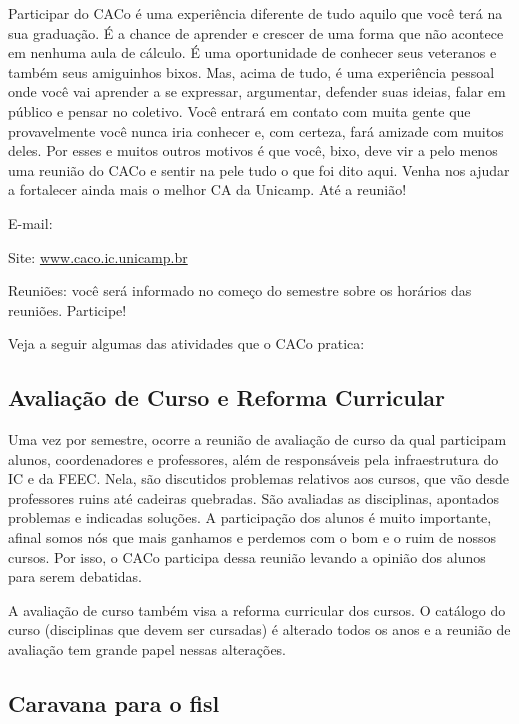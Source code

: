 Participar do CACo é uma experiência diferente de tudo aquilo que você terá na
sua graduação. É a chance de aprender e crescer de uma forma que não acontece em
nenhuma aula de cálculo. É uma oportunidade de conhecer seus veteranos e também
seus amiguinhos bixos. Mas, acima de tudo, é uma experiência pessoal onde você
vai aprender a se expressar, argumentar, defender suas ideias, falar em público
e pensar no coletivo. Você entrará em contato com muita gente que provavelmente
você nunca iria conhecer e, com certeza, fará amizade com muitos deles. Por
esses e muitos outros motivos é que você, bixo, deve vir a pelo menos uma
reunião do CACo e sentir na pele tudo o que foi dito aqui. Venha nos ajudar a
fortalecer ainda mais o melhor CA da Unicamp. Até a reunião!

\begin{compactitemize}
\item  E-mail: 
\item  Site: \url{www.caco.ic.unicamp.br}
\item  Reuniões: você será informado no começo do semestre sobre os horários das reuniões. Participe!
\end{compactitemize}

Veja a seguir algumas das atividades que o CACo pratica:

\subsection{Avaliação de Curso e Reforma Curricular}

Uma vez por semestre, ocorre a reunião de avaliação de curso da qual participam
alunos, coordenadores e professores, além de responsáveis pela infraestrutura do
IC e da FEEC. Nela, são discutidos problemas relativos aos cursos, que vão desde
professores ruins até cadeiras quebradas. São avaliadas as disciplinas,
apontados problemas e indicadas soluções. A participação dos alunos é muito
importante, afinal somos nós que mais ganhamos e perdemos com o bom e o ruim de
nossos cursos. Por isso, o CACo participa dessa reunião levando a opinião dos
alunos para serem debatidas.

A avaliação de curso também visa a reforma curricular dos cursos. O catálogo do
curso (disciplinas que devem ser cursadas) é alterado todos os anos e a reunião
de avaliação tem grande papel nessas alterações.

\subsection{Caravana para o fisl}

